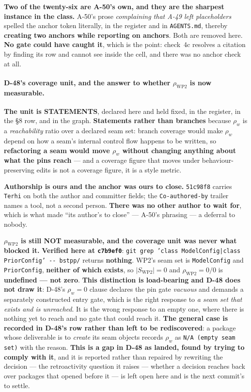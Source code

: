 \documentclass[
  10pt,
]{article}
\begin{document}
\textbf{Two of the twenty-six are A-50's own, and they are the sharpest instance in the class.} A-50's prose \emph{complaining that A-49 left placeholders} spelled the anchor token literally, in the register and in \texttt{AGENTS.md}, thereby \textbf{creating two anchors while reporting on anchors}. Both are removed here. \textbf{No gate could have caught it}, which is the point: check~4c resolves a citation by finding its row and cannot see inside the cell, and there was no anchor check at all.

\paragraph{D-48's coverage unit, and the answer to whether $\rho_{\mathrm{WP2}}$ is now measurable.}
\textbf{The unit is STATEMENTS}, declared here and held fixed, in the register, in the \S8 row, and in the graph. \textbf{Statements rather than branches} because $\rho_w$ is a \emph{reachability} ratio over a declared seam set: branch coverage would make $\rho_w$ depend on how a seam's internal control flow happens to be written, so \textbf{refactoring a seam would move $\rho_w$ without changing anything about what the pins reach} --- and a coverage figure that moves under behaviour-preserving edits is not a coverage figure, it is a style metric.

\textbf{Authorship is ours and the anchor was ours to close.} \texttt{51c98f8} carries \texttt{Terhi} on both the author and committer fields; the \texttt{Co-authored-by} trailer names a tool, not a second person. \textbf{There was no other author to wait for}, which is what made ``its author's to close'' --- A-50's phrasing --- a deferral to nobody.

\textbf{$\rho_{\mathrm{WP2}}$ is still NOT measurable, and the coverage unit was never what blocked it.} \textbf{Verified here at \texttt{c7b9ef0}}: \texttt{git grep 'class ModelConfig|class PriorConfig' -{}- bstpp/} returns \textbf{nothing}. WP2's seam set is \texttt{ModelConfig} and \texttt{PriorConfig}, \textbf{neither of which exists}, so $\lvert S_{\mathrm{WP2}}\rvert = 0$ and $\rho_{\mathrm{WP2}} = 0/0$ is \textbf{undefined --- not zero}. \textbf{This distinction is load-bearing and D-48 does not draw it}: D-48's $\rho_w = 0$ clause declares the pin gate \emph{vacuous} and demands a separately constructed entry gate, which is the right response to \emph{a seam set that exists and is unreached}. It is the wrong response to an empty one, where there is nothing yet to reach and no gate that could reach it. \textbf{The general case is recorded in D-48's row rather than left to be rediscovered}: a package whose deliverable is to \emph{create} its seam objects records $\rho_w$ as \texttt{N/A (empty seam set)} with the reason. \textbf{This is a gap in D-48 as landed, found by trying to comply with it}, and it is reported rather than repaired by rewriting the decision --- the retroactivity question it raises --- whether a decision reaches back over packages that opened before it --- is left open here and is the next commit's to settle.
\end{document}

